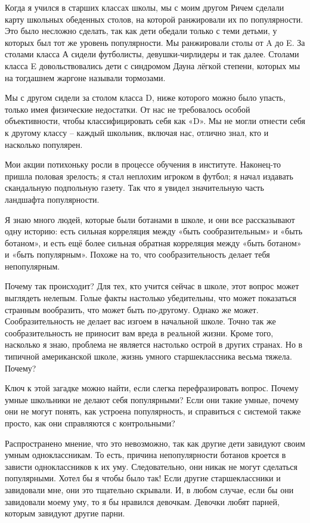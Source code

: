 \documentclass[ebook,12pt,oneside,openany]{memoir}
\date{}
\begin{document}
\maketitle
Когда я учился в старших классах школы, мы с моим другом Ричем сделали
карту школьных обеденных столов, на которой ранжировали их по
популярности. Это было несложно сделать, так как дети обедали только с
теми детьми, у которых был тот же уровень популярности. Мы ранжировали
столы от A до E. За столами класса А сидели футболисты,
девушки-чирлидеры и так далее. Столами класса E довольствовались дети
с синдромом Дауна лёгкой степени, которых мы на тогдашнем жаргоне
называли тормозами.

Мы с другом сидели за столом класса D, ниже которого можно было
упасть, только имея физические недостатки. От нас не требовалось
особой объективности, чтобы классифицировать себя как «D». Мы не могли
отнести себя к другому классу – каждый школьник, включая нас, отлично
знал, кто и насколько популярен.

Мои акции потихоньку росли в процессе обучения в институте. Наконец-то
пришла половая зрелость; я стал неплохим игроком в футбол; я начал
издавать скандальную подпольную газету. Так что я увидел значительную
часть ландшафта популярности.

Я знаю много людей, которые были ботанами в школе, и они все
рассказывают одну историю: есть сильная корреляция между «быть
сообразительным» и «быть ботаном», и есть ещё более сильная обратная
корреляция между «быть ботаном» и «быть популярным». Похоже на то, что
сообразительность делает тебя непопулярным.

Почему так происходит? Для тех, кто учится сейчас в школе, этот вопрос
может выглядеть нелепым. Голые факты настолько убедительны, что может
показаться странным вообразить, что может быть по-другому. Однако же
может. Сообразительность не делает вас изгоем в начальной школе. Точно
так же сообразительность не приносит вам вреда в реальной жизни. Кроме
того, насколько я знаю, проблема не является настолько острой в других
странах. Но в типичной американской школе, жизнь умного
старшеклассника весьма тяжела. Почему?


Ключ к этой загадке можно найти, если слегка перефразировать вопрос.
Почему умные школьники не делают себя популярными? Если они такие
умные, почему они не могут понять, как устроена популярность, и
справиться с системой также просто, как они справляются с
контрольными?

Распространено мнение, что это невозможно, так как другие дети
завидуют своим умным одноклассникам. То есть, причина непопулярности
ботанов кроется в зависти одноклассников к их уму. Следовательно, они
никак не могут сделаться популярными. Хотел бы я чтобы было так! Если
другие старшеклассники и завидовали мне, они это тщательно скрывали.
И, в любом случае, если бы они завидовали моему уму, то я бы нравился
девочкам. Девочки любят парней, которым завидуют другие парни.
\end{document}
